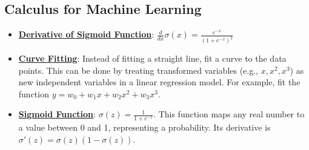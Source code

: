 \documentclass{article}%
\begin{document}
%
\subsection{Calculus for Machine Learning}%
\label{subsec:CalculusforMachineLearning}%
\begin{itemize}[leftmargin=*]%
\item \href{https://purdue.brightspace.com/d2l/common/assets/pdfjs-d2l-dist/1.0.14-legacy/web/viewer.html?file=\%2Fcontent\%2Fenforced\%2F1095467-wl.202510.CS.24300.001\%2F04L1-Linear Algebra Primer.pdf\%3Fou\%3D1095467\&lang=en-us\&container=d2l-fileviewer-rendered-pdf\&fullscreen=d2l-fileviewer-rendered-pdf-dialog\&height=667#page=21}{\textbf{Derivative of Sigmoid Function}}: $\frac{d}{dx} \sigma(x) = \frac{e^{-x}}{(1 + e^{-x})^2}$%
\item \href{https://purdue.brightspace.com/d2l/common/assets/pdfjs-d2l-dist/1.0.14-legacy/web/viewer.html?file=\%2Fcontent\%2Fenforced\%2F1095467-wl.202510.CS.24300.001\%2F05L2-ML Basics.pdf\%3Fou\%3D1095467\&lang=en-us\&container=d2l-fileviewer-rendered-pdf\&fullscreen=d2l-fileviewer-rendered-pdf-dialog\&height=667#page=13}{\textbf{Curve Fitting}}: Instead of fitting a straight line, fit a curve to the data points. This can be done by treating transformed variables (e.g., $x, x^2, x^3$) as new independent variables in a linear regression model. For example, fit the function $y = w_0 + w_1x + w_2x^2 + w_3x^3$.%
\item \href{https://purdue.brightspace.com/d2l/common/assets/pdfjs-d2l-dist/1.0.14-legacy/web/viewer.html?file=\%2Fcontent\%2Fenforced\%2F1095467-wl.202510.CS.24300.001\%2F05L2-ML Basics.pdf\%3Fou\%3D1095467\&lang=en-us\&container=d2l-fileviewer-rendered-pdf\&fullscreen=d2l-fileviewer-rendered-pdf-dialog\&height=667#page=32}{\textbf{Sigmoid Function}}: $\sigma(z) = \frac{1}{1 + e^{-z}}$. This function maps any real number to a value between 0 and 1, representing a probability. Its derivative is $\sigma'(z) = \sigma(z)(1 - \sigma(z))$.%
\end{itemize}

%
\end{document}
